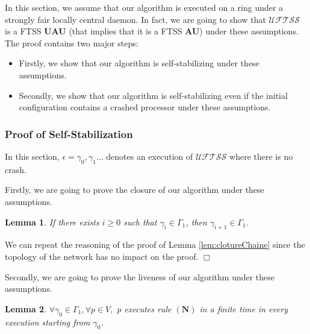 \documentclass[11pt,english,letterpaper]{article}
\newtheorem{lemma}{Lemma}
\newenvironment{proof}{{\noindent\bf Proof. } }{{\hfill $\Box$}}
\begin{document}
In this section, we assume that our algorithm is executed on a ring under a strongly fair locally central daemon. In fact, we are going to show that $\mathcal{UFTSS}$ is a FTSS \textbf{UAU} (that implies that it is a FTSS \textbf{AU}) under these assumptions. The proof contains two major steps:

\begin{itemize}
\item Firstly, we show that our algorithm is self-stabilizing under these assumptions.
\item Secondly, we show that our algorithm is self-stabilizing even if the initial configuration contains a crashed processor under these assumptions.
\end{itemize}

\subsubsection{Proof of Self-Stabilization}

In this section, $\epsilon=\gamma_{0},\gamma_{1}\ldots$ denotes an execution of $\mathcal{UFTSS}$ where there is no crash.

Firstly, we are going to prove the closure of our algorithm under these assumptions.

\begin{lemma}\label{lem:clotureAnneau}
If there exists $i\geq 0$ such that $\gamma_{i}\in \Gamma_{1}$, then $\gamma_{i+1}\in\Gamma_{1}$.
\end{lemma}

\begin{proof}
We can repeat the reasoning of the proof of Lemma \ref{lem:clotureChaine} since the topology of the network has no impact on the proof.
\end{proof}
		
Secondly, we are going to prove the liveness of our algorithm under these assumptions.

\begin{lemma}\label{lem:prelemVivaciteAnneau}
$\forall\gamma_{0}\in\Gamma_{1},\forall p\in V,$ $p$ executes rule $\boldsymbol{(N)}$ in a finite time in every execution starting from $\gamma_{0}$.
\end{lemma}
\end{document}
